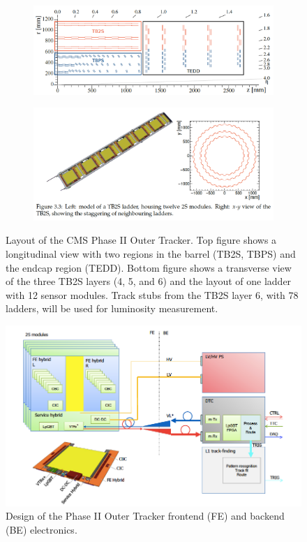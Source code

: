\begin{figure}[hbtp]
\centering
\begin{subfigure}
  \centering
  \includegraphics[width=.9\linewidth]{tex/Part2/fig/OT/OT-longitudinal.png}
\end{subfigure}
\begin{subfigure}
  \centering
  \includegraphics[width=.9\linewidth]{tex/Part2/fig/OT/OT-transverse.png}
\end{subfigure}
\caption{
  Layout of the CMS Phase II Outer Tracker.
  Top figure shows a longitudinal view with two regions in the barrel (TB2S, TBPS) and the endcap region (TEDD).
  Bottom figure shows a transverse view of the three TB2S layers (4, 5, and 6) and the layout of one ladder with 12 sensor modules.
  Track stubs from the  TB2S layer 6, with 78 ladders, will be used for luminosity measurement.  
}
\label{fig:OT_layout}
\end{figure}


\begin{figure}[hbtp]
\centering
\includegraphics[width=.65\linewidth]{tex/Part2/fig/OT/OT-DAQoverview.png}
\caption{
  Design of the Phase II Outer Tracker frontend (FE) and backend (BE) electronics.   
}   
\label{fig:OT_DAQ}
\end{figure}


